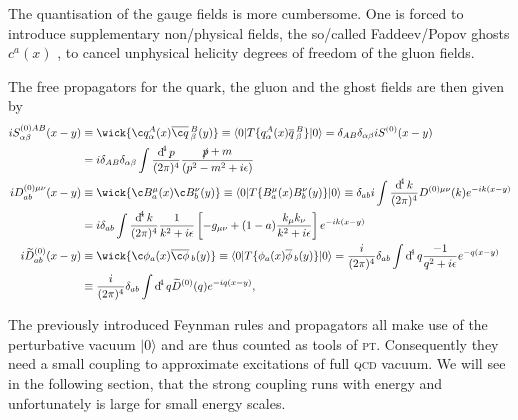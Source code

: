 \documentclass[../../index.tex]{subfiles}
\begin{document}
The quantisation of the gauge fields is more cumbersome. One is forced to
introduce supplementary non\-/physical fields, the so\-/called Faddeev\-/Popov
ghosts $c^a(x)$ \cite{Faddeev1967}, to cancel unphysical helicity degrees of
freedom of the gluon fields.

The free propagators for the quark, the gluon and the ghost fields are then
given by
\begin{equation}
  \begin{split}
    i S^{(0)AB}_{\alpha\beta}(x-y) &\equiv \wick{ \c q_\alpha^A(x) \anti{\c
        q}_\beta^B(y)} \equiv \langle 0 \vert T \{ q_\alpha^A(x)
    \anti{q}_\beta^B \} \vert 0 \rangle
    = \delta_{AB} \delta_{\alpha\beta} i S^{(0)}(x-y) \\
    &= i \delta_{AB}\delta_{\alpha\beta}\int \fdif{p} \frac{\slashed p + m}{(p^2 - m^2 + i\epsilon)}\\
    i D^{(0)\mu\nu}_{ab}(x-y) &\equiv \wick{ \c B_a^\mu(x) \c B_b^\nu(y)} \equiv
    \langle 0 \vert T \{ B_a^\mu(x) B_b^\nu(y) \} \vert 0 \rangle
    \equiv \delta_{ab}i \int \frac{\dif^4 k}{(2\pi)^4} D^{(0)\mu\nu}(k) e^{-ik(x-y)} \\
    &= i \delta_{ab} \int \frac{\dif^4 k}{(2\pi)^4} \frac{1}{k^2+i\epsilon} \left[ -g_{\mu\nu} + (1-a) \frac{k_\mu k_\nu}{k^2+i\epsilon} \right] e^{-ik(x-y)} \\
    i \widetilde{D}_{ab}^{(0)}(x-y) & \equiv \wick{\c \phi_a(x) \anti{\c
        \phi}_b(y)} \equiv \langle 0 \vert T\{ \phi_a(x) \anti{\phi}_b(y) \}
    \vert 0 \rangle
    = \frac{i}{(2\pi)^4}\delta_{ab} \int \dif^4 q \frac{-1}{q^2 + i\epsilon} e^{-q(x-y)} \\
    &\equiv \frac{i}{(2\pi)^4} \delta_{ab} \int \dif^4 q \widetilde{D}^{(0)}(q)
    e^{-iq(x-y)},
  \end{split}
\end{equation}

The previously introduced Feynman rules and propagators all make use of the
perturbative vacuum \(\vert 0 \rangle\) and are thus counted as tools of
\textsc{pt}. Consequently they need a small coupling to approximate excitations
of full \textsc{qcd} vacuum. We will see in the following section, that the
strong coupling runs with energy and unfortunately is large for small energy
scales.
\end{document}
